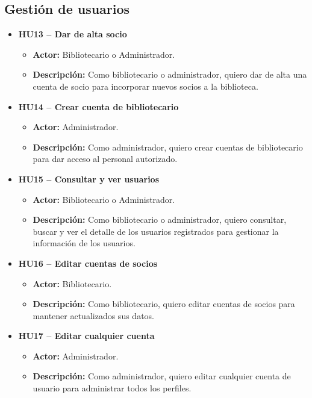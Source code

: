 \subsection{Gestión de usuarios}
\begin{itemize}
	\item \textbf{HU13 -- Dar de alta socio}
	\begin{itemize}
		\item \textbf{Actor:} Bibliotecario o Administrador.
		\item \textbf{Descripción:} Como bibliotecario o administrador, quiero dar de alta una cuenta de socio para incorporar nuevos socios a la biblioteca.
	\end{itemize}
	
	\item \textbf{HU14 -- Crear cuenta de bibliotecario}
	\begin{itemize}
		\item \textbf{Actor:} Administrador.
		\item \textbf{Descripción:} Como administrador, quiero crear cuentas de bibliotecario para dar acceso al personal autorizado.
	\end{itemize}
	
	\item \textbf{HU15 -- Consultar y ver usuarios}
	\begin{itemize}
		\item \textbf{Actor:} Bibliotecario o Administrador.
		\item \textbf{Descripción:} Como bibliotecario o administrador, quiero consultar, buscar y ver el detalle de los usuarios registrados para gestionar la información de los usuarios.
	\end{itemize}
	
	\item \textbf{HU16 -- Editar cuentas de socios}
	\begin{itemize}
		\item \textbf{Actor:} Bibliotecario.
		\item \textbf{Descripción:} Como bibliotecario, quiero editar cuentas de socios para mantener actualizados sus datos.
	\end{itemize}
	
	\item \textbf{HU17 -- Editar cualquier cuenta}
	\begin{itemize}
		\item \textbf{Actor:} Administrador.
		\item \textbf{Descripción:} Como administrador, quiero editar cualquier cuenta de usuario para administrar todos los perfiles.
	\end{itemize}
	

\end{itemize}
